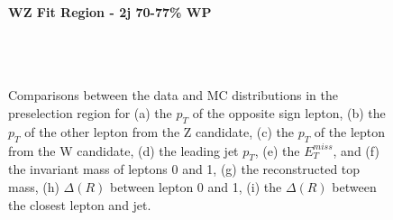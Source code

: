 \begin{figure}[H] 
    \centering
    \textbf{WZ Fit Region - 2j 70-77\% WP}\\
    \\
    \\
    \\
    \caption{Comparisons between the data and MC distributions in the preselection region for (a) the $p_T$ of the opposite sign lepton, (b) the $p_T$ of the other lepton from the Z candidate, (c) the $p_T$ of the lepton from the W candidate, (d) the leading jet $p_T$, (e) the $E_T^{miss}$, and (f) the invariant mass of leptons 0 and 1, (g) the reconstructed top mass, (h) $\Delta(R)$  between lepton 0 and 1, (i) the $\Delta(R)$ between the closest lepton and jet.}
    \label{kin:WP_2j_70_77}
\end{figure}

